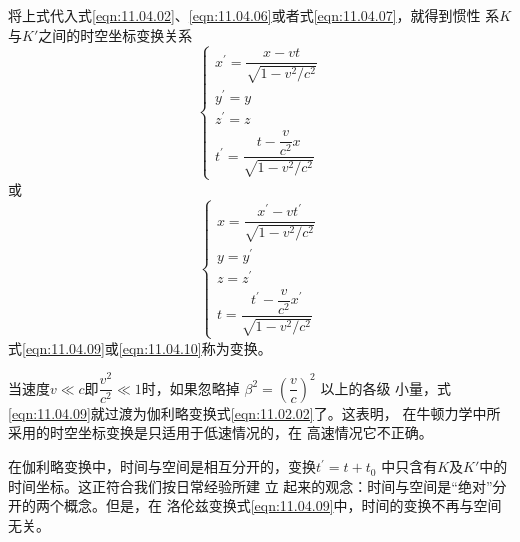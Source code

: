 将上式代入式\eqref{eqn:11.04.02}、\eqref{eqn:11.04.06}或者式\eqref{eqn:11.04.07}，就得到惯性
系$ K $与$ K' $之间的时空坐标变换关系
\begin{equation}\label{eqn:11.04.09}
    \begin{cases}
        x ^ { \prime } = \dfrac { x - v t } { \sqrt { 1 - v ^ 2 / c ^ 2 } } \\
        y ^ { \prime } = y \\
        z ^ { \prime } = z \\
        t ^ { \prime } = \dfrac { t - \dfrac v { c ^ 2 } x } { \sqrt { 1 - v ^ 2 / c ^ 2 } }
    \end{cases}
\end{equation}
或
\begin{equation}\label{eqn:11.04.10}
    \begin{cases}
        x = \dfrac { x ^ { \prime } - v t ^ { \prime } } { \sqrt { 1 - v ^ 2 / c ^ 2 } } \\
        y = y ^ { \prime } \\
        z = z ^ { \prime } \\
        t = \dfrac { t ^ { \prime } - \dfrac v { c ^ 2 } x ^ { \prime } } { \sqrt { 1 - v ^ 2 / c ^ 2 } }
    \end{cases}
\end{equation}
式\eqref{eqn:11.04.09}或\eqref{eqn:11.04.10}称为变换。

当速度$ v \ll c $即$ \dfrac { v ^ { 2 } } { c ^ { 2 } } \ll 1 $时，如果忽略掉
$ \beta ^ { 2 } = \left( \dfrac { v } { c } \right) ^ { 2 }  $
以上的各级
小量，式\eqref{eqn:11.04.09}就过渡为伽利略变换式\eqref{eqn:11.02.02}了。这表明，
在牛顿力学中所采用的时空坐标变换是只适用于低速情况的，在
高速情况它不正确。

在伽利略变换中，时间与空间是相互分开的，变换$ t ^ { \prime } = t + t _ { 0 }  $
中只含有$ K $及$ K ' $中的时间坐标。这正符合我们按日常经验所建
立
起来的观念：时间与空间是“绝对”分开的两个概念。但是，在
洛伦兹变换\lhbrak 式\eqref{eqn:11.04.09}\rhbrak 中，时间的变换不再与空间无关。